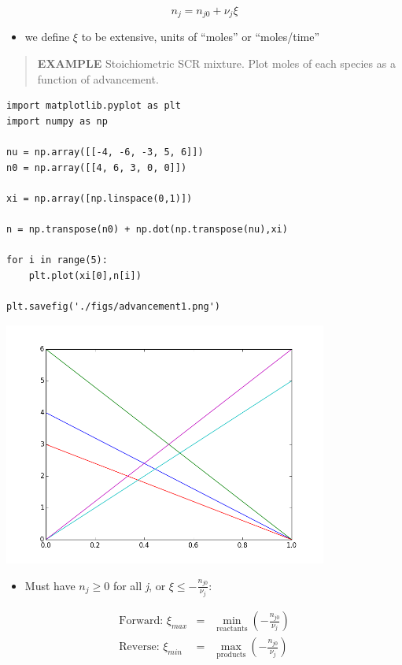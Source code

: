 \documentclass[11pt]{article}
\begin{document}
\begin{equation*}
n_{j} = n_{j0} + \nu_{j} \xi
\end{equation*}

\begin{itemize}
\item we define $\xi$ to be extensive, units of ``moles'' or ``moles/time''
\end{itemize}

\begin{quote}
\hline
\textbf{EXAMPLE} Stoichiometric SCR mixture.  Plot moles of each species as a function of advancement.
\hline
\end{quote}
\begin{verbatim}
import matplotlib.pyplot as plt
import numpy as np

nu = np.array([[-4, -6, -3, 5, 6]])
n0 = np.array([[4, 6, 3, 0, 0]])

xi = np.array([np.linspace(0,1)])

n = np.transpose(n0) + np.dot(np.transpose(nu),xi)

for i in range(5):
    plt.plot(xi[0],n[i])

plt.savefig('./figs/advancement1.png')
\end{verbatim}

\includegraphics[width=0.8\textwidth]{./figs/advancement1.png}


\begin{itemize}
\item Must have \(n_{j} \ge 0\) for all \emph{j}, or \( \xi \le -\frac{n_{j0}}{\nu_{j}}\):
\end{itemize}

\begin{eqnarray*}
\text{Forward: } \xi_{max} & =  & \min_\text{reactants} \left ( -\frac{n_{j0}}{\nu_{j}}\right ) \\
\text{Reverse: } \xi_{min} & = & \max_\text{products}\left (-\frac{n_{j0}}{\nu_{j}} \right )
\end{eqnarray*}
\end{document}
